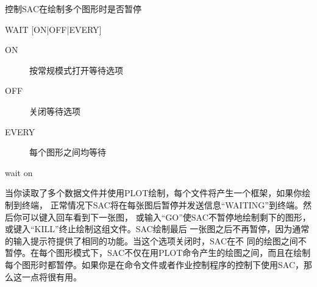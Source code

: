 \label{cmd:wait}

控制SAC在绘制多个图形时是否暂停

\begin{SACSTX}
WAIT [ON|OFF|EVERY]
\end{SACSTX}

\begin{description}
\item [ON] 按常规模式打开等待选项 
\item [OFF] 关闭等待选项 
\item [EVERY] 每个图形之间均等待
\end{description}

\begin{SACDFT}
wait on
\end{SACDFT}

当你读取了多个数据文件并使用PLOT绘制，每个文件将产生一个框架，如果你绘制到终端，
正常情况下SAC将在每张图后暂停并发送信息``WAITING''到终端。然后你可以键入回车看到下一张图，
或输入``GO''使SAC不暂停地绘制剩下的图形，或键入``KILL''终止绘制这组文件。SAC绘制最后
一张图之后不再暂停，因为通常的输入提示符提供了相同的功能。当这个选项关闭时，SAC在不
同的绘图之间不暂停。在每个图形模式下，SAC不仅在用PLOT命令产生的绘图之间，而且在绘制
每个图形时都暂停。如果你是在命令文件或者作业控制程序的控制下使用SAC，那么这一点将很有用。
